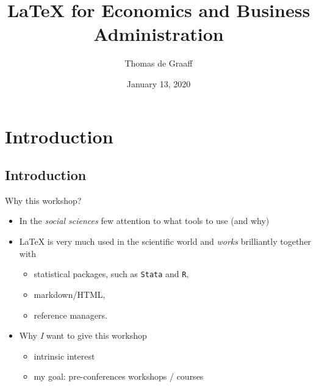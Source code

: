 \documentclass[ignorenonframetext]{beamer}
\title{\LaTeX{} for Economics and Business Administration}
\author{Thomas de Graaff}
\date{January 13, 2020}
\begin{document}
\frame{\titlepage}

\section{Introduction}\label{introduction}

\subsection{Introduction}\label{introduction-1}

\begin{frame}{Why this workshop?}

\begin{itemize}
\item
  In the \emph{social sciences} few attention to what tools to use (and why)
  \newline
\item
  \LaTeX{} is very much used in the scientific world and \emph{works} brilliantly together with
  \begin{itemize}
  \item statistical packages, such as \texttt{Stata} and \texttt{R},
  \item markdown/HTML,
  \item reference managers.
  \newline
  \end{itemize}
  \item Why \emph{I} want to give this workshop
  \begin{itemize}
	  \item intrinsic interest
	  \item my goal: pre-conferences workshops / courses
  \end{itemize}
\end{itemize}
\end{frame}
\end{document}
